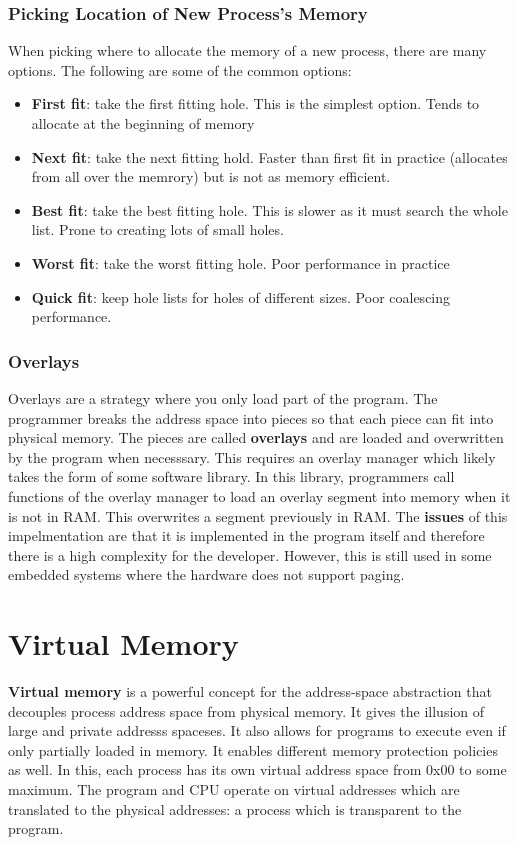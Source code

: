 \documentclass{article}
\newcommand{\bold}[1]{\textbf{#1}}
\renewcommand{\b}{\item[$\circ$]}
\newcommand{\newlist}{\begin{itemize}}
\renewcommand{\endlist}{\end{itemize}}
\begin{document}
\subsubsection{Picking Location of New Process's Memory}

When picking where to allocate the memory of a new process, there are many options. The following are some of the common options:

\newlist
\b \bold{First fit}: take the first fitting hole. This is the simplest option. Tends to allocate at the beginning of memory
\b \bold{Next fit}: take the next fitting hold. Faster than first fit in practice (allocates from all over the memrory) but is not as memory efficient.
\b \bold{Best fit}: take the best fitting hole. This is slower as it must search the whole list. Prone to creating lots of small holes. 
\b \bold{Worst fit}: take the worst fitting hole. Poor performance in practice
\b \bold{Quick fit}: keep hole lists for holes of different sizes. Poor coalescing performance.
\endlist

\subsubsection{Overlays}

Overlays are a strategy where you only load part of the program. The programmer breaks the address space into pieces so that each piece can fit into physical memory. The pieces are called \bold{overlays} and are loaded and overwritten by the program when necesssary. This requires an overlay manager which likely takes the form of some software library. In this library, programmers call functions of the overlay manager to load an overlay segment into memory when it is not in RAM. This overwrites a segment previously in RAM. The \bold{issues} of this impelmentation are that it is implemented in the program itself and therefore there is a high complexity for the developer. However, this is still used in some embedded systems where the hardware does not support paging. 

\section{Virtual Memory}

\bold{Virtual memory} is a powerful concept for the address-space abstraction that decouples process address space from physical memory. It gives the illusion of large and private addresss spaceses. It also allows for programs to execute even if only partially loaded in memory. It enables different memory protection policies as well. In this, each process has its own virtual address space from 0x00 to some maximum. The program and CPU operate on virtual addresses which are translated to the physical addresses: a process which is transparent to the program. \\ 
\end{document}
